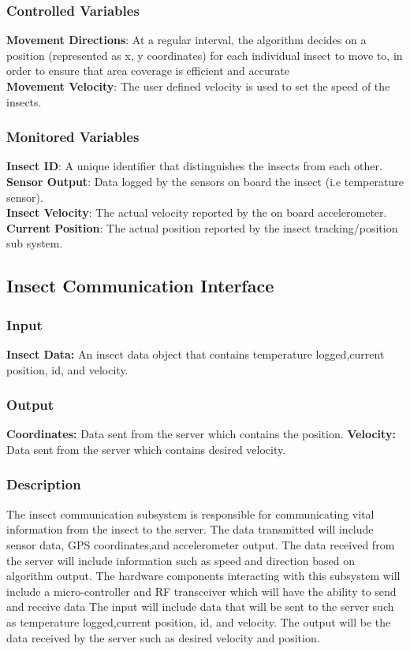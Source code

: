 \documentclass[11pt]{article}
\begin{document}
\subsubsection{Controlled Variables}
\textbf{Movement Directions}: At a regular interval, the algorithm decides on a position (represented as
x, y coordinates) for each individual insect to move to, in order to ensure that area coverage is efficient and accurate \\
\textbf{Movement Velocity}: The user defined velocity is used to set the speed of the insects.

\subsubsection{Monitored Variables}
\textbf{Insect ID}: A unique identifier that distinguishes the insects from each other. \\  
\textbf{Sensor Output}: Data logged by the sensors on board the insect (i.e temperature sensor). \\
\textbf{Insect Velocity}: The actual velocity reported by the on board accelerometer. \\ 
\textbf{Current Position}: The actual position reported by the insect tracking/position sub system. \\

\subsection{Insect Communication Interface}
\subsubsection{Input}
\textbf{Insect Data:} An insect data object that contains temperature logged,current position, id, and velocity. 
\subsubsection{Output}
\textbf{Coordinates:} Data sent from the server which contains the position.
\textbf{Velocity:} Data sent from the server which contains desired velocity.
\subsubsection{Description}
The insect communication subsystem is responsible for communicating vital information from the insect to the server. The data  transmitted will include sensor data, GPS coordinates,and accelerometer output. The data received from the server will include information such as speed and direction based on algorithm output. The hardware components interacting with this subsystem will include a micro-controller and RF transceiver which will have the ability to send and receive data The input will include data that will be sent to the server such as temperature logged,current position, id, and velocity. The output will be the data received by the server such as desired velocity and position. 
\end{document}
